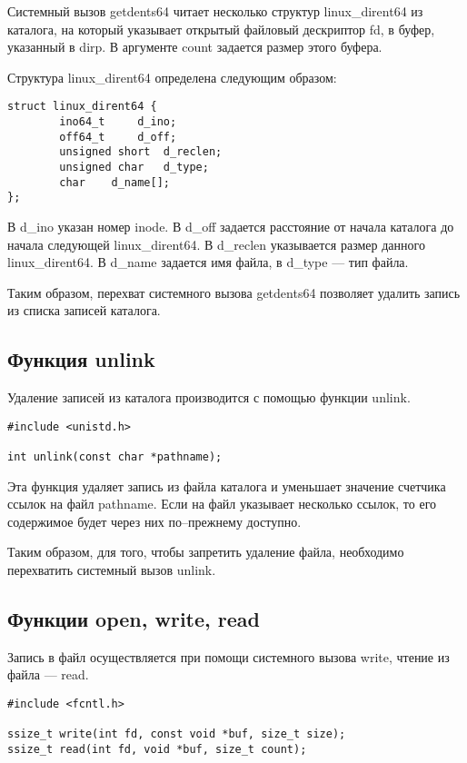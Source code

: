 Системный вызов getdents64 читает несколько структур linux\_dirent64 из каталога, на который указывает открытый файловый дескриптор fd, в буфер, указанный в dirp. В аргументе count задается размер этого буфера.

Структура linux\_dirent64 определена следующим образом:
\clearpage
\begin{lstlisting}[label=code:linuxdirent64,caption=Структура linux\_dirent64]
struct linux_dirent64 {
		ino64_t		d_ino;
		off64_t		d_off;    
		unsigned short	d_reclen; 
		unsigned char	d_type;  
		char	d_name[]; 
};
\end{lstlisting}

В d\_ino указан номер inode. В d\_off задается расстояние от начала каталога до начала следующей linux\_dirent64. В d\_reclen указывается размер данного linux\_dirent64. В d\_name задается имя файла, в d\_type --- тип файла.
 
Таким образом, перехват системного вызова getdents64 позволяет удалить запись из списка записей каталога.

\subsection{Функция unlink}

Удаление записей из каталога производится с помощью функции unlink.

\begin{lstlisting}[label=code:unlink,caption=Функция unlink]
#include <unistd.h>

int unlink(const char *pathname);
\end{lstlisting}

Эта функция удаляет запись из файла каталога и уменьшает значение счетчика ссылок на файл pathname. Если на файл указывает несколько ссылок, то его содержимое будет через них по--прежнему доступно.

Таким образом, для того, чтобы запретить удаление файла, необходимо перехватить системный вызов unlink.



\subsection{Функции open, write, read}

Запись в файл осуществляется при помощи системного вызова  write, чтение из файла --- read.
\begin{lstlisting}[label=code:read_write,caption=Функции write и read]
#include <fcntl.h>

ssize_t write(int fd, const void *buf, size_t size);
ssize_t read(int fd, void *buf, size_t count);
\end{lstlisting}

